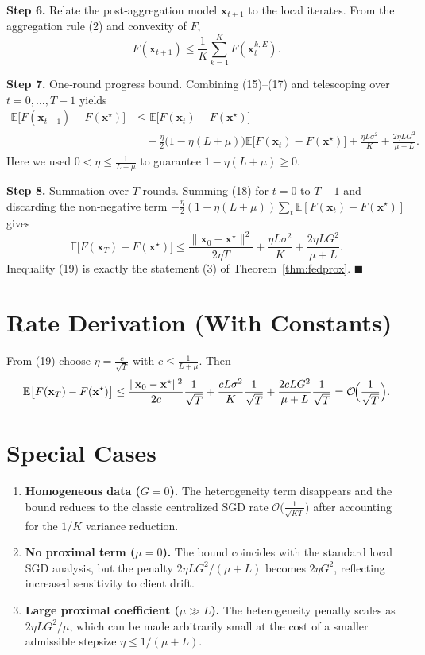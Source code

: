 \documentclass{article}
\begin{document}
\textbf{Step 6.}  Relate the post‑aggregation model $\mathbf{x}_{t+1}$ to the local iterates.  
From the aggregation rule (2) and convexity of $F$,
\[
F(\mathbf{x}_{t+1}) \le \frac{1}{K}\sum_{k=1}^{K}F(\mathbf{x}_{t}^{k,E}).
\tag{17}
\]

\textbf{Step 7.}  One‑round progress bound.  
Combining (15)–(17) and telescoping over $t=0,\dots,T-1$ yields
\[
\begin{aligned}
\mathbb{E}\bigl[F(\mathbf{x}_{t+1})-F(\mathbf{x}^\star)\bigr]
&\le \mathbb{E}\bigl[F(\mathbf{x}_{t})-F(\mathbf{x}^\star)\bigr]\\
&\quad -\frac{\eta}{2}\bigl(1-\eta(L+\mu)\bigr)
      \mathbb{E}\bigl[F(\mathbf{x}_{t})-F(\mathbf{x}^\star)\bigr]
      +\frac{\eta L\sigma^2}{K}
      +\frac{2\eta L G^2}{\mu+L}.
\end{aligned}
\tag{18}
\]
Here we used $0<\eta\le\frac{1}{L+\mu}$ to guarantee $1-\eta(L+\mu)\ge0$.

\textbf{Step 8.}  Summation over $T$ rounds.  
Summing (18) for $t=0$ to $T-1$ and discarding the non‑negative term $-\frac{\eta}{2}(1-\eta(L+\mu))\sum_{t}\mathbb{E}[F(\mathbf{x}_{t})-F(\mathbf{x}^\star)]$ gives
\[
\mathbb{E}\bigl[F(\mathbf{x}_{T})-F(\mathbf{x}^\star)\bigr]
\le
\frac{\|\mathbf{x}_{0}-\mathbf{x}^\star\|^2}{2\eta T}
   +\frac{\eta L\sigma^2}{K}
   +\frac{2\eta L G^2}{\mu+L}.
\tag{19}
\]
Inequality (19) is exactly the statement (3) of Theorem~\ref{thm:fedprox}. \hfill $\blacksquare$

\section*{Rate Derivation (With Constants)}
From (19) choose $\eta = \frac{c}{\sqrt{T}}$ with $c\le\frac{1}{L+\mu}$.
Then
\[
\mathbb{E}\bigl[F(\mathbf{x}_{T})-F(\mathbf{x}^\star)\bigr]
\le
\frac{\|\mathbf{x}_{0}-\mathbf{x}^\star\|^2}{2c}\frac{1}{\sqrt{T}}
   +\frac{cL\sigma^2}{K}\frac{1}{\sqrt{T}}
   +\frac{2cL G^2}{\mu+L}\frac{1}{\sqrt{T}}
   =\mathcal{O}\!\Bigl(\frac{1}{\sqrt{T}}\Bigr).
\]

\section*{Special Cases}
\begin{enumerate}
    \item \textbf{Homogeneous data ($G=0$).}  
    The heterogeneity term disappears and the bound reduces to the classic centralized SGD rate $\mathcal{O}\!\bigl(\frac{1}{\sqrt{KT}}\bigr)$ after accounting for the $1/K$ variance reduction.
    \item \textbf{No proximal term ($\mu=0$).}  
    The bound coincides with the standard local SGD analysis, but the penalty $2\eta L G^2/(\mu+L)$ becomes $2\eta G^2$, reflecting increased sensitivity to client drift.
    \item \textbf{Large proximal coefficient ($\mu\gg L$).}  
    The heterogeneity penalty scales as $2\eta L G^2/\mu$, which can be made arbitrarily small at the cost of a smaller admissible stepsize $\eta\le 1/(\mu+L)$.
\end{enumerate}
\end{document}

